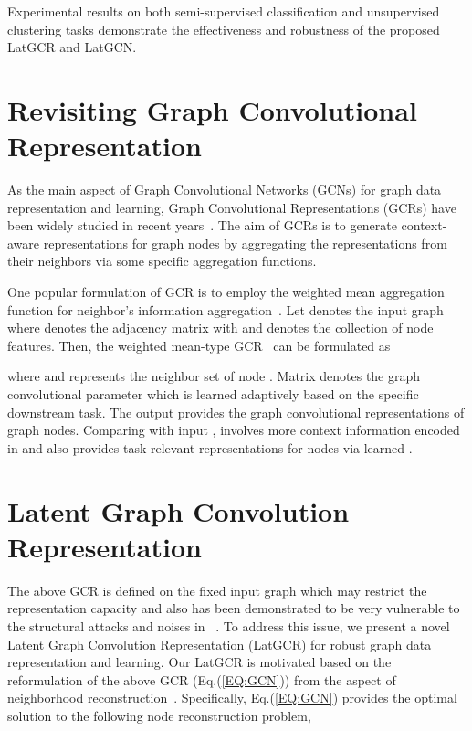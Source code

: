 \documentclass{article}
\begin{document}
  Experimental results on both semi-supervised classification and unsupervised clustering tasks demonstrate the effectiveness and robustness of the proposed LatGCR and LatGCN.


\section{Revisiting Graph Convolutional Representation}

As the main aspect of Graph Convolutional Networks (GCNs) for graph data representation and learning, Graph Convolutional Representations (GCRs) have been widely studied in recent years~\cite{defferrard2016convolutional,kipf2016semi,graphsage,velickovic2017graph,NEURIPS2020_99e314b1}.
The aim of GCRs is to generate context-aware representations for graph nodes by aggregating the representations from their neighbors via some specific aggregation functions.

One popular formulation of GCR is to employ the weighted mean aggregation function for neighbor's information aggregation~\cite{graphsage,PaGCN}.
Let  denotes the input graph where
 denotes the adjacency matrix with  and  denotes the collection of node features.
Then, the weighted mean-type GCR~\cite{graphsage} can be formulated as


where  and
 represents the neighbor set of node .
Matrix  denotes the graph convolutional parameter which is learned adaptively based on the specific downstream task.
The output  provides the graph convolutional representations of graph nodes. Comparing with input ,  involves more context information encoded in  and also provides task-relevant representations for nodes via learned .


\section{Latent Graph Convolution Representation}


The above GCR is defined on the fixed input graph  which may restrict the representation capacity and also has been demonstrated to be
very vulnerable to the structural attacks and noises in ~\cite{mettack,prognn,jin2020adversarial}.
To address this issue,   we present a novel Latent Graph Convolution Representation (LatGCR) for robust graph data
representation and learning.
Our LatGCR is motivated based on the reformulation of the above GCR (Eq.(\ref{EQ:GCN}))  from the aspect of neighborhood reconstruction~\cite{NEURIPS2020_99e314b1,PaGCN}.
 Specifically, Eq.(\ref{EQ:GCN}) provides the optimal solution to
the following node reconstruction problem,
\end{document}
